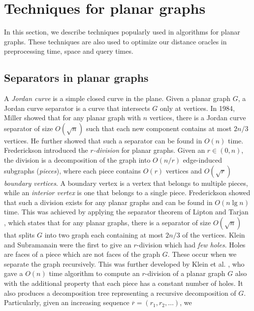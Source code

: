 \section{Techniques for planar graphs}\label{techniques}
In this section, we describe techniques popularly used in algorithms for planar graphs.
These techniques are also used to optimize our distance oracles in preprocessing time, space and
query times.

\subsection{Separators in planar graphs}\label{rdiv2}
A \textit{Jordan curve} is a simple closed curve in the plane. Given a planar graph $G$,
a Jordan curve separator is a curve that intersects $G$ only at vertices. In 1984, Miller
\cite{miller1984finding} showed that for any planar graph with $n$ vertices, there is a Jordan curve
separator of size $O(\sqrt{n})$ such that each new component contains at most $2n/3$
vertices. He further showed that such a separator can be found in $O(n)$ time. \\
Frederickson \cite{frederickson1987fast} introduced the \textit{$r$-division} for planar
graphs. Given an $r\in (0,n)$, the division is a decomposition of the graph into
$O(n/r)$ edge-induced subgraphs (\textit{pieces}), where each piece contains $O(r)$ vertices and $O(\sqrt{r})$ \textit{boundary vertices}. A
boundary vertex is a vertex that belongs to multiple pieces, while an \textit{interior
vertex} is one that belongs to a single piece. Frederickson showed that
such a division exists for any planar graphs and can be found in $O(n\lg n)$ time. This
was achieved by applying the separator theorem of Lipton and Tarjan
\cite{lipton1979separator}, which states that for any planar graphs, there is a separator
of size $O(\sqrt{n})$ that splits $G$ into two graph each containing at most $2n/3$ of
the vertices. Klein and Subramanain \cite{klein1998fully} were the first to give an
$r$-division which had \textit{few holes}. Holes are faces of a piece which are not faces
of the graph $G$. These occur when we separate the graph recursively. This was further developed
by Klein et al. \cite{klein2013structured}, who gave a $O(n)$ time algorithm to compute
an $r$-division of a planar graph $G$ also with the additional property that each piece has a
constant number of holes. It also produces a decomposition tree representing a recursive
decomposition of $G$. Particularly, given an increasing sequence $\overline{r}=(r_1,r_2,\dots)$, we
